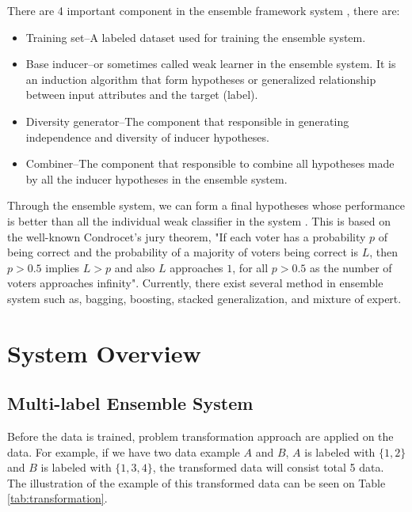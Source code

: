 \documentclass{article}
\begin{document}
There are 4 important component in the ensemble framework system \cite{Rokach2010}, there are:

\begin{itemize}
\item Training set--A labeled dataset used for training the ensemble system.
\item Base inducer--or sometimes called weak learner in the ensemble system. It is an induction algorithm that form hypotheses or generalized relationship between input attributes and the target (label).
\item Diversity generator--The component that responsible in generating independence and diversity of inducer hypotheses.
\item Combiner--The component that responsible to combine all hypotheses made by all the inducer hypotheses in the ensemble system.
\end{itemize}

Through the ensemble system, we can form a final hypotheses whose performance is better than all the individual weak classifier in the system \cite{Rokach2010}. This is based on the well-known Condrocet's jury theorem, "If each voter has a probability $p$ of being correct and the probability of a majority of voters being correct is $L$, then $p > 0.5$ implies $L > p$ and also $L$ approaches $1$, for all $p > 0.5$ as the number of voters approaches infinity". Currently, there exist several method in ensemble system such as, bagging, boosting, stacked generalization, and mixture of expert.



\section{System Overview}
\label{overview}

\subsection{Multi-label Ensemble System}
Before the data is trained, problem transformation approach are applied on the data. For example, if we have two data example $A$ and $B$, $A$ is labeled with $\{1,2\}$ and $B$ is labeled with $\{1,3,4\}$, the transformed data will consist total 5 data. The illustration of the example of this transformed data can be seen on Table \ref{tab:transformation}.
\end{document}
